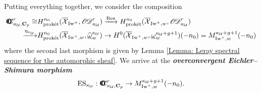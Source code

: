 Putting everything together, we consider the composition
\begin{align*}
 \OC_{\kappa_{\calU}, \C_p}^{r} \cong & H_{\proket}^{n_0}(\overline{\calX}_{\Iw^+}, \sheafOD_{\kappa_{\calU}}^r)\xrightarrow[]{\Res}  H_{\proket}^{n_0}(\overline{\calX}_{\Iw^+,w}, \sheafOD_{\kappa_{\calU}}^r)\\
  \xrightarrow[]{\eta_{\kappa_{\calU}}} & H_{\proket}^{n_0}(\overline{\calX}_{\Iw^+, w}, \widehat{\underline{\omega}}_w^{\kappa_{\calU}}) \rightarrow H^0(\overline{\calX}_{\Iw^+, w}, \underline{\omega}_w^{\kappa_{\calU}+g+1})(-n_0)=M_{\Iw^+, w}^{\kappa_{\calU}+g+1}(-n_0)
 \end{align*}
where the second last morphism is given by Lemma \ref{Lemma: Leray spectral sequence for the automorphic sheaf}. We arrive at the \textbf{\textit{overconvergent Eichler--Shimura morphism}}
\begin{align*}
    \operatorname{ES}_{\kappa_{\operatorname{\mathcal{U}}}}:\operatorname{\mathbf{O}\!\!\!\!\mathbf{C}}_{\kappa_{\operatorname{\mathcal{U}}}, \operatorname{\mathbf{C}}_p}^{r}\rightarrow M_{\operatorname{Iw}^+, w}^{\kappa_{\operatorname{\mathcal{U}}}+g+1}(-n_0).
\end{align*} 

